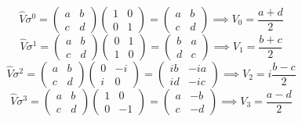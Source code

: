 \documentclass[letter]{article}
\begin{document}
\[
	\hat{V} \sigma^{0} = \begin{pmatrix} a & b \\ c & d \end{pmatrix} 
	\begin{pmatrix} 1 & 0 \\ 0 & 1 \end{pmatrix}  = 
	\begin{pmatrix} a & b \\ c & d \end{pmatrix}  \implies
	V_0 = \frac{a+d}{2}
\] 
\[
	\hat{V} \sigma^{1} = \begin{pmatrix} a & b \\ c & d \end{pmatrix} 
	\begin{pmatrix} 0 & 1 \\ 1 & 0 \end{pmatrix}  = 
	\begin{pmatrix} b & a \\ d & c \end{pmatrix}  \implies
	V_1 = \frac{b+c}{2}
\] 
\[
	\hat{V} \sigma^{2} = \begin{pmatrix} a & b \\ c & d \end{pmatrix} 
	\begin{pmatrix} 0 & -i \\ i & 0 \end{pmatrix}  = 
	\begin{pmatrix} ib & -ia  \\ id & -ic \end{pmatrix}  \implies
	V_2 = i\frac{b-c}{2}
\] 
\[
	\hat{V} \sigma^{3} = \begin{pmatrix} a & b \\ c & d \end{pmatrix} 
	\begin{pmatrix} 1 & 0 \\ 0 & -1 \end{pmatrix}  = 
	\begin{pmatrix} a & -b \\ c & -d \end{pmatrix}  \implies
	V_3 = \frac{a-d}{2}
\] 
\end{document}
